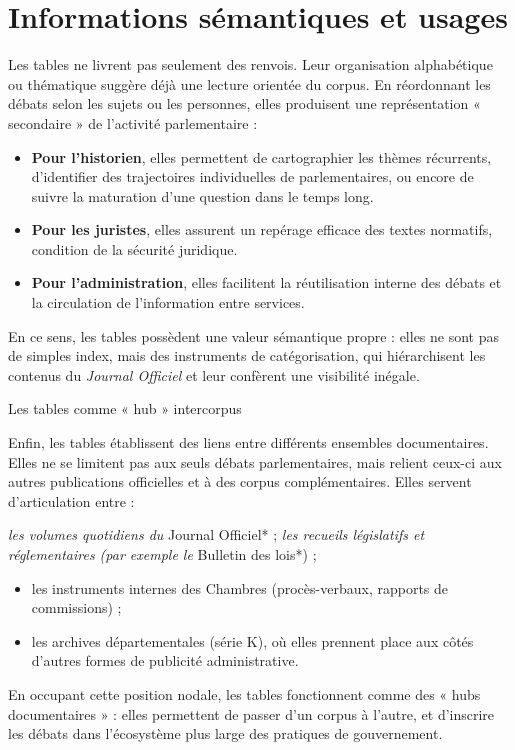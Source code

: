 \section{Informations sémantiques et usages}

Les tables ne livrent pas seulement des renvois. Leur organisation alphabétique ou thématique suggère déjà une lecture orientée du corpus. En réordonnant les débats selon les sujets ou les personnes, elles produisent une représentation « secondaire » de l’activité parlementaire :

\begin{itemize}
\item \textbf{Pour l’historien}, elles permettent de cartographier les thèmes récurrents, d’identifier des trajectoires individuelles de parlementaires, ou encore de suivre la maturation d’une question dans le temps long.
\item \textbf{Pour les juristes}, elles assurent un repérage efficace des textes normatifs, condition de la sécurité juridique.
\item \textbf{Pour l’administration}, elles facilitent la réutilisation interne des débats et la circulation de l’information entre services.

\end{itemize}
En ce sens, les tables possèdent une valeur sémantique propre : elles ne sont pas de simples index, mais des instruments de catégorisation, qui hiérarchisent les contenus du \emph{Journal Officiel} et leur confèrent une visibilité inégale.

Les tables comme « hub » intercorpus

Enfin, les tables établissent des liens entre différents ensembles documentaires. Elles ne se limitent pas aux seuls débats parlementaires, mais relient ceux-ci aux autres publications officielles et à des corpus complémentaires. Elles servent d’articulation entre :

\emph{ les volumes quotidiens du }Journal Officiel* ;
\emph{ les recueils législatifs et réglementaires (par exemple le }Bulletin des lois*) ;
\begin{itemize}
\item les instruments internes des Chambres (procès-verbaux, rapports de commissions) ;
\item les archives départementales (série K), où elles prennent place aux côtés d’autres formes de publicité administrative.

\end{itemize}
En occupant cette position nodale, les tables fonctionnent comme des « hubs documentaires » : elles permettent de passer d’un corpus à l’autre, et d’inscrire les débats dans l’écosystème plus large des pratiques de gouvernement.

